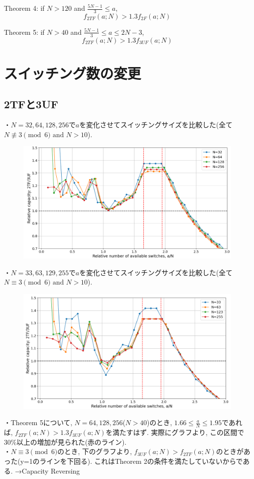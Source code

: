 \documentclass[11pt, a4paper]{jarticle}
\begin{document}
Theorem 4: if $N > 120$ and $\frac{5N-1}{3} \leq a $, 
$$f_{2TF}(a; N) > 1.3f_{2F}(a; N)$$

Theorem 5: if $N > 40$ and $\frac{5N-1}{3} \leq a \leq 2N-3$, 
$$f_{2TF}(a; N) > 1.3f_{3UF}(a; N)$$


\section{スイッチング数の変更}
\subsection{2TFと3UF}
・$N=32, 64, 128, 256$で$a$を変化させてスイッチングサイズを比較した(全て$N \not\equiv 3 \pmod{6} \text{ and } N > 10$). 
\begin{figure}[H]
    \centering
    \includegraphics[width=0.8\linewidth]{compare_relative_3uf_1.png}
\end{figure}


・$N=33, 63, 129, 255$で$a$を変化させてスイッチングサイズを比較した(全て$N \equiv 3 \pmod{6} \text{ and } N > 10$).
\begin{figure}[H]
  \centering
  \includegraphics[width=0.8\linewidth]{compare_relative_3uf_2.png}
\end{figure}

\noindent・Theorem 5について, $N=64, 128, 256$($N>40$)のとき, $1.66 \leq \frac{a}{N} \leq 1.95$であれば, $f_{2TF}(a; N) > 1.3f_{3UF}(a; N)$を満たすはず. 
実際にグラフより, この区間で$30\%$以上の増加が見られた(赤のライン).\\
・$N \equiv 3 \pmod{6}$のとき, 下のグラフより, $f_{3UF}(a; N) > f_{2TF}(a; N)$のときがあった(y=1のラインを下回る). これはTheorem 2の条件を満たしていないからである. 
→Capacity Reversing
\end{document}
